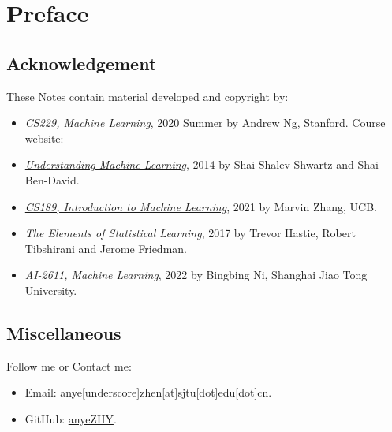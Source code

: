 \section*{Preface}
\subsection*{Acknowledgement}
These Notes contain material developed and copyright by:
\begin{itemize}
	\item
		\href{http://cs229.stanford.edu/syllabus-summer2020.html}{\textit{CS229, Machine Learning}}, {\textcopyright} 2020 Summer by Andrew Ng, Stanford. Course website: 
	\item 
		\href{https://www.cs.huji.ac.il/w~shais/UnderstandingMachineLearning/}{\textit{Understanding Machine Learning}}, {\textcopyright} 2014 by Shai Shalev-Shwartz and Shai Ben-David.
	\item
		\href{https://www.eecs189.org}{\textit{CS189, Introduction to Machine Learning}}, {\textcopyright} 2021 by Marvin Zhang, UCB.
	\item
		\textit{The Elements of Statistical Learning}, {\textcopyright} 2017 by  Trevor Hastie, Robert Tibshirani and Jerome Friedman.
	\item
		\textit{AI-2611, Machine Learning}, {\textcopyright} 2022 by Bingbing Ni, Shanghai Jiao Tong University.
\end{itemize}

\subsection*{Miscellaneous}
Follow me or Contact me:
\begin{itemize}
	\item
		Email: anye[underscore]zhen[at]sjtu[dot]edu[dot]cn.
	\item
		GitHub: \href{http://githb.com/anyeZHY}{anyeZHY}.
\end{itemize}

